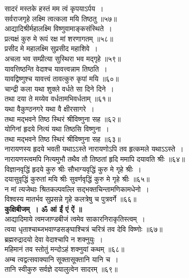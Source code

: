 \documentclass[twoside,top=1.7cm, bottom=1.7cm, outer=1cm,landscape, inner=1.5cm,a5paper,]{book}
\begin{document}
\begin{center}
\newpage
सादरं मस्तके हस्तं मम त्वं कृपयाऽर्पय~।\\
सर्वराजगृहे लक्ष्मि त्वत्कला मयि तिष्ठतु ॥५७॥\\[10pt]
आद्यादिश्रीर्महालक्ष्मि विष्णुवामाङ्कसंस्थिते~।\\
प्रत्यक्षं कुरु मे रूपं रक्ष मां शरणागतम् ॥५८॥\\[10pt]
प्रसीद मे महालक्ष्मि सुप्रसीद महाशिवे~।\\
अचला भव सम्प्रीत्या सुस्थिरा भव मद्गृहे ॥५९॥\\[10pt]
यावत्तिष्ठन्ति वेदाश्च यावत्त्वन्नाम तिष्ठति~।\\
यावद्विष्णुश्च यावत्त्वं तावत्कुरु कृपां मयि ॥६०॥\\[10pt]
\newpage
चान्द्री कला यथा शुक्ले वर्धते सा दिने दिने~।\\
तथा दया ते मय्येव वर्धतामभिवर्धताम् ॥६१॥\\[10pt]
यथा वैकुण्ठनगरे यथा वै क्षीरसागरे~।\\
तथा मद्भवने तिष्ठ स्थिरं श्रीविष्णुना सह ॥६२॥\\[10pt]
योगिनां हृदये नित्यं यथा तिष्ठसि विष्णुना~।\\
तथा मद्भवने तिष्ठ स्थिरं श्रीविष्णुना सह ॥६३॥\\[10pt]
नारायणस्य हृदये भवती यथाऽऽस्ते नारायणोऽपि तव हृत्कमले यथाऽऽस्ते~।\\
नारायणस्त्वमपि नित्यमुभौ तथैव तौ तिष्ठतां हृदि ममापि दयावति श्रीः ॥६४॥\\[10pt]
\newpage
विज्ञानवृद्धिं हृदये कुरु श्रीः सौभाग्यवृद्धिं कुरु मे गृहे श्रीः~।\\
दयासुवृद्धिं कुरुतां मयि श्रीः सुवर्णवृद्धिं कुरु मे गृहे श्रीः ॥६५॥\\[10pt]
न मां त्यजेथाः श्रितकल्पवल्लि सद्भक्तचिन्तामणिकामधेनो~।\\
विश्वस्य मातर्भव सुप्रसन्ने गृहे कलत्रेषु च पुत्रवर्गे ॥६६॥\\[10pt]
{\bfseries कुक्षिबीजम्~। ॐ आं ईं एं ऐं ॥}\\[10pt]
आद्यादिमाये त्वमजाण्डबीजं त्वमेव साकारनिराकृतिस्त्वम्~।\\
त्वया धृताश्चाब्जभवाण्डसङ्घाश्चित्रं चरित्रं तव देवि विष्णोः ॥६७॥\\[10pt]
ब्रह्मरुद्रादयो देवा वेदाश्चापि न शक्नुयुः~।\\
महिमानं तव स्तोतुं मन्दोऽहं शक्नुयां कथम् ॥६८॥\\[10pt]
अम्ब त्वद्वत्सवाक्यानि सूक्तासूक्तानि यानि च~।\\
तानि स्वीकुरु सर्वज्ञे दयालुत्वेन सादरम् ॥६९॥\\[10pt]

\end{center}
\end{document}
